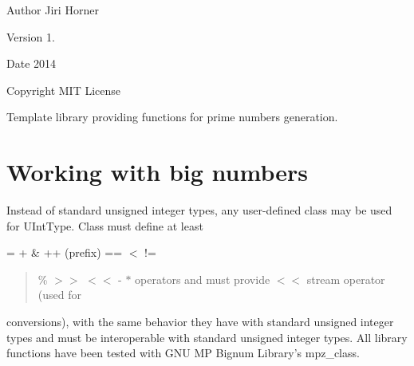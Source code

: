 \begin{DoxyAuthor}{Author}
Jiri Horner
\end{DoxyAuthor}
\begin{DoxyVersion}{Version}
1. 
\end{DoxyVersion}
\begin{DoxyDate}{Date}
2014 
\end{DoxyDate}
\begin{DoxyCopyright}{Copyright}
M\+I\+T License
\end{DoxyCopyright}
Template library providing functions for prime numbers generation.\hypertarget{index_bignums}{}\section{Working with big numbers}\label{index_bignums}
Instead of standard unsigned integer types, any user-\/defined class may be used for {\ttfamily U\+Int\+Type}. Class must define at least {\ttfamily = + \& ++ (prefix) == $<$ != \begin{quote}
\% $>$$>$ $<$$<$ -\/ $\ast$ operators and must provide $<$$<$ stream operator (used for \end{quote}
conversions), with the same behavior they have with standard unsigned integer types and must be interoperable with standard unsigned integer types. All library functions have been tested with G\+N\+U M\+P Bignum Library's {\ttfamily mpz\+\_\+class}. }